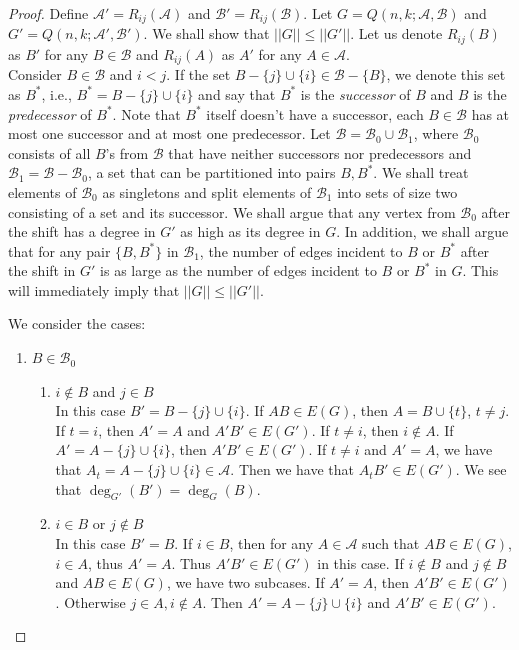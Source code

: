 \documentclass[11pt, a4paper]{article}
\newcommand{\cA}{\mathcal{A}}
\newcommand{\cB}{\mathcal{B}}
\begin{document}
\begin{proof}
	Define $ \cA'= {R}_{ij}(\cA)$ and $\cB' ={R}_{ij}(\cB).$
	Let $G= Q(n,k;\cA,\cB)$ and $G' = Q(n,k;\cA',\cB').$  We shall show that $||G|| \leq ||G'||$. 
	Let us denote $R_{ij}(B)$ as $B'$ for any $B\in \cB$ and $R_{ij}(A)$ as $A'$ for any $A\in \cA$. \\
	
	Consider $B\in\cB$ and $i<j$.  If  the set $B-\{j\}\cup \{i\} \in \cB -\{B\}$, we denote this set as $B^*$, i.e.,  $B^*= B-\{j\}\cup \{i\}$ and say that $B^*$ is the {\it successor} of $B$ and $B$ is the {\it predecessor} of $B^*$.  Note that $B^*$ itself doesn't have a successor,  each $B\in \cB$ has at most one successor and at most one predecessor. 
	Let $\cB= \cB_0\cup \cB_1$, where $\cB_0$ consists of all $B$'s  from $\cB$ that have neither successors nor predecessors and $\cB_1= \cB-\cB_0$, a set that can be partitioned into pairs $B, B^*$. We shall treat elements of $\cB_0$ as singletons and split elements of $\cB_1$ into sets of size two consisting of a set and its successor.
	We shall argue that any vertex from $\cB_0$ after the shift has a degree in $G'$ as high as its degree in $G$. In addition, we shall argue that for any pair $\{B, B^*\}$ in $\cB_1$, 
	the number of edges incident to $B$ or $B^*$ after the shift in $G'$ is as large as the number of edges incident to $B$ or $B^*$ in $G$. This will immediately imply that $||G||\leq ||G'||$.
	
	We consider the cases:
	\begin{enumerate}
	\item{} $B\in \cB_0$
	
	\begin{enumerate}
	\item{} $i\not\in B$ and  $j\in B$\\
	In this case $B' = B-\{j\}\cup\{i\}$.
	If $AB\in E(G)$, then $A=B\cup \{t\}$, $t\neq j$. 
	If $t=i$, then $A'=A$ and $A'B' \in E(G')$.
	If $t\neq i$, then $i\not\in A$. If $A' = A-\{j\} \cup \{i\}$, then $A'B'\in E(G')$.  If $t\neq i$ and $A'=A$, we have that $A_t=A-\{j\}\cup \{i\} \in \cA$. 
	Then we have that $A_tB' \in E(G')$.  We see that $\deg_{G'}(B') = \deg_G(B)$.
	
	\item{} $i\in B$ or $j\not\in B$\\
	In this case  $B'=B$.
	If $i\in B$, then for any $A\in \cA$ such that $AB\in E(G)$, $i\in A$, thus $A'=A$. Thus $A'B'\in E(G')$ in this case.
	If $i\not\in B$ and $j\not\in B$  and $AB\in E(G)$, we have two subcases. If $A'=A$, then $A'B'\in E(G')$. Otherwise $j\in A, i\not\in A$.  Then  $A'= A-\{j\}\cup \{i\}$ and $A'B'\in E(G')$.
	\end{enumerate}


\end{enumerate}
\end{proof}
\end{document}
